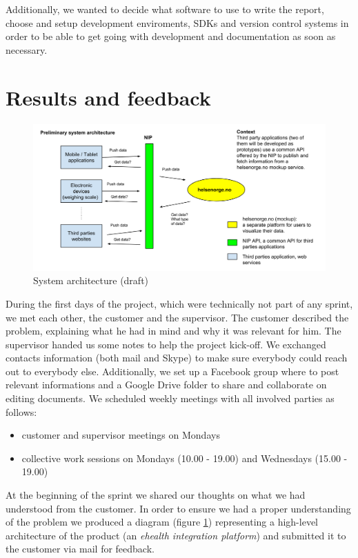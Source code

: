Additionally, we wanted to decide what software to use to write the report,
choose and setup development enviroments, SDKs and version control systems in order to be able
to get going with development and documentation as soon as necessary.


\section{Results and feedback}

\begin{figure}[h]
\centering
\includegraphics[scale=0.30]{../Figures/architecture-draft.png}
\caption{System architecture (draft)}
\label{figure:architecture-draft}
\end{figure}

During the first days of the project, which were technically not part of any sprint,
we met each other, the customer and the supervisor.
The customer described the problem, explaining what he had in mind and why it was relevant for him.
The supervisor handed us some notes to help the project kick-off.
We exchanged contacts information (both mail and Skype) to make sure everybody could reach out to
everybody else. Additionally, we set up a Facebook group where to post relevant informations
and a Google Drive folder to share and collaborate on editing documents.
We scheduled weekly meetings with all involved parties as follows:
\begin{itemize}
\item customer and supervisor meetings on Mondays
\item collective work sessions on Mondays (10.00 - 19.00) and Wednesdays (15.00 - 19.00)
\end{itemize}

At the beginning of the sprint we shared our thoughts on what we had understood from the customer.
In order to ensure we had a proper understanding of the problem we produced a diagram
(figure \ref{figure:architecture-draft}) representing a high-level architecture
of the product (an \textit{ehealth integration platform}) and submitted it to the customer
via mail for feedback.

